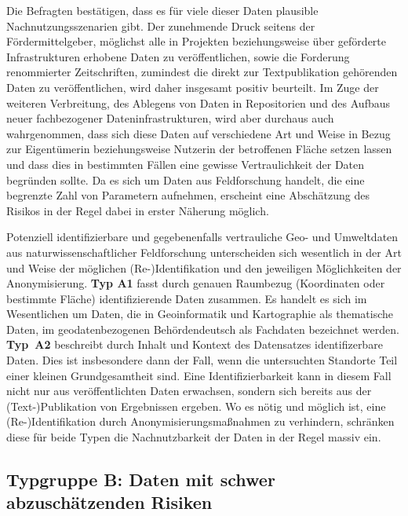 \documentclass[a4paper,
fontsize=11pt,
oneside,
numbers=noperiodatend,
parskip=half-,
bibliography=totoc,
final
]{scrartcl}
\begin{document}
Die Befragten bestätigen, dass es für viele dieser Daten plausible
Nachnutzungsszenarien gibt. Der zunehmende Druck seitens der
Fördermittelgeber, möglichst alle in Projekten beziehungsweise über
geförderte Infrastrukturen erhobene Daten zu veröffentlichen, sowie die
Forderung renommierter Zeitschriften, zumindest die direkt zur
Textpublikation gehörenden Daten zu veröffentlichen, wird daher
insgesamt positiv beurteilt. Im Zuge der weiteren Verbreitung, des
Ablegens von Daten in Repositorien und des Aufbaus neuer fachbezogener
Dateninfrastrukturen, wird aber durchaus auch wahrgenommen, dass sich
diese Daten auf verschiedene Art und Weise in Bezug zur Eigentümerin
beziehungsweise Nutzerin der betroffenen Fläche setzen lassen und dass
dies in bestimmten Fällen eine gewisse Vertraulichkeit der Daten
begründen sollte. Da es sich um Daten aus Feldforschung handelt, die
eine begrenzte Zahl von Parametern aufnehmen, erscheint eine Abschätzung
des Risikos in der Regel dabei in erster Näherung möglich.

Potenziell identifizierbare und gegebenenfalls vertrauliche Geo- und
Umweltdaten aus naturwissenschaftlicher Feldforschung unterscheiden sich
wesentlich in der Art und Weise der möglichen (Re-)Identifikation und
den jeweiligen Möglichkeiten der Anonymisierung. \textbf{Typ A1} fasst
durch genauen Raumbezug (Koordinaten oder bestimmte Fläche)
identifizierende Daten zusammen. Es handelt es sich im Wesentlichen um
Daten, die in Geoinformatik und Kartographie als thematische Daten, im
geodatenbezogenen Behördendeutsch als Fachdaten bezeichnet werden.
\textbf{Typ~A2} beschreibt durch Inhalt und Kontext des Datensatzes
identifizerbare Daten. Dies ist insbesondere dann der Fall, wenn die
untersuchten Standorte Teil einer kleinen Grundgesamtheit sind. Eine
Identifizierbarkeit kann in diesem Fall nicht nur aus veröffentlichten
Daten erwachsen, sondern sich bereits aus der (Text-)Publikation von
Ergebnissen ergeben. Wo es nötig und möglich ist, eine
(Re-)Identifikation durch Anonymisierungsmaßnahmen zu verhindern,
schränken diese für beide Typen die Nachnutzbarkeit der Daten in der
Regel massiv ein.

\hypertarget{typgruppe-b-daten-mit-schwer-abzuschuxe4tzenden-risiken}{%
\subsection{Typgruppe B: Daten mit schwer abzuschätzenden
Risiken}\label{typgruppe-b-daten-mit-schwer-abzuschuxe4tzenden-risiken}}
\end{document}
